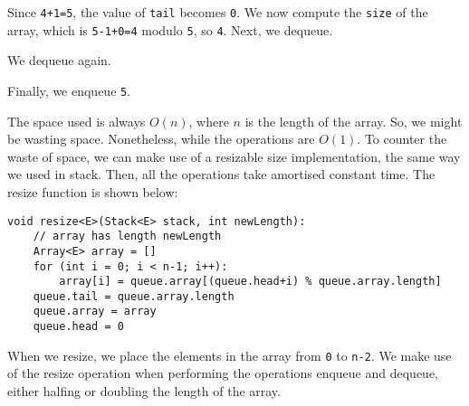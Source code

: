 \documentclass[a4paper, openany]{memoir}
\begin{document}
Since \texttt{4+1=5}, the value of \texttt{tail} becomes \texttt{0}. We now compute the \texttt{size} of the array, which is \texttt{5-1+0=4} modulo \texttt{5}, so \texttt{4}. Next, we dequeue.
\begin{center}
\end{center}
We dequeue again.
\begin{center}
\end{center}
Finally, we enqueue \texttt{5}.
\begin{center}
\end{center}
The space used is always $O(n)$, where $n$ is the length of the array. So, we might be wasting space. Nonetheless, while the operations are $O(1)$. To counter the waste of space, we can make use of a resizable size implementation, the same way we used in stack. Then, all the operations take amortised constant time. The resize function is shown below:
\begin{lstlisting}[language=pseudocode]
void resize<E>(Stack<E> stack, int newLength):
    // array has length newLength
    Array<E> array = []
    for (int i = 0; i < n-1; i++):
        array[i] = queue.array[(queue.head+i) % queue.array.length]
    queue.tail = queue.array.length
    queue.array = array
    queue.head = 0
\end{lstlisting}
When we resize, we place the elements in the array from \texttt{0} to \texttt{n-2}. We make use of the resize operation when performing the operations enqueue and dequeue, either halfing or doubling the length of the array.
\end{document}
